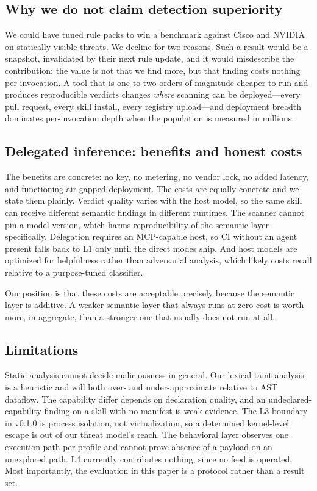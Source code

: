 \documentclass[11pt]{article}
\begin{document}
\subsection{Why we do not claim detection superiority}

We could have tuned rule packs to win a benchmark against Cisco and NVIDIA on statically visible threats. We decline for two reasons. Such a result would be a snapshot, invalidated by their next rule update, and it would misdescribe the contribution: the value is not that we find more, but that finding costs nothing per invocation. A tool that is one to two orders of magnitude cheaper to run and produces reproducible verdicts changes \emph{where} scanning can be deployed---every pull request, every skill install, every registry upload---and deployment breadth dominates per-invocation depth when the population is measured in millions.

\subsection{Delegated inference: benefits and honest costs}

The benefits are concrete: no key, no metering, no vendor lock, no added latency, and functioning air-gapped deployment. The costs are equally concrete and we state them plainly. Verdict quality varies with the host model, so the same skill can receive different semantic findings in different runtimes. The scanner cannot pin a model version, which harms reproducibility of the semantic layer specifically. Delegation requires an MCP-capable host, so CI without an agent present falls back to L1 only until the direct modes ship. And host models are optimized for helpfulness rather than adversarial analysis, which likely costs recall relative to a purpose-tuned classifier.

Our position is that these costs are acceptable precisely because the semantic layer is additive. A weaker semantic layer that always runs at zero cost is worth more, in aggregate, than a stronger one that usually does not run at all.

\subsection{Limitations}

Static analysis cannot decide maliciousness in general. Our lexical taint analysis is a heuristic and will both over- and under-approximate relative to AST dataflow. The capability differ depends on declaration quality, and an undeclared-capability finding on a skill with no manifest is weak evidence. The L3 boundary in v0.1.0 is process isolation, not virtualization, so a determined kernel-level escape is out of our threat model's reach. The behavioral layer observes one execution path per profile and cannot prove absence of a payload on an unexplored path. L4 currently contributes nothing, since no feed is operated. Most importantly, the evaluation in this paper is a protocol rather than a result set.
\end{document}

